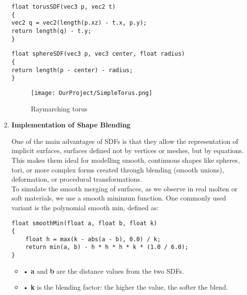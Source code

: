 \documentclass{rapportcs}
\begin{document}
\begin{enumerate}
        \begin{lstlisting}[style=cppstyle]
float torusSDF(vec3 p, vec2 t) 
{
vec2 q = vec2(length(p.xz) - t.x, p.y);
return length(q) - t.y;
}
        \end{lstlisting}

        \begin{lstlisting}[style=cppstyle]
float sphereSDF(vec3 p, vec3 center, float radius) 
{
return length(p - center) - radius;
}
        \end{lstlisting}
    
        \begin{figure}[H]
            \centering
            \texttt{[image: OurProject/SimpleTorus.png]}
            \caption{Raymarching torus}
            \label{fig:label_image}
        \end{figure}

        
      \item \textbf{Implementation of Shape Blending}

        One of the main advantages of SDFs is that they allow the representation of implicit surfaces, surfaces defined not by vertices or meshes, but by equations. This makes them ideal for modelling smooth, continuous shapes like spheres, tori, or more complex forms created through blending (smooth unions), deformation, or procedural transformations.\\

        \noindent To simulate the smooth merging of surfaces, as we observe in real molten or soft materials, we use a smooth minimum function. One commonly used variant is the polynomial smooth min, defined as:

        \begin{lstlisting}[style=cppstyle]
float smoothMin(float a, float b, float k) 
{
    float h = max(k - abs(a - b), 0.0) / k;
    return min(a, b) - h * h * h * k * (1.0 / 6.0);
}
        \end{lstlisting}

        \begin{itemize}
            \item[\hspace{1cm}] • \textbf{a} and \textbf{b} are the distance values from the two SDFs.
            \item[\hspace{1cm}] • \textbf{k} is the blending factor: the higher the value, the softer the blend.\\
        \end{itemize}


\end{enumerate}
\end{document}
